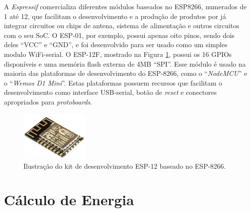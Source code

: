 A \textit{Espressif} comercializa diferentes módulos baseados no ESP8266, numerados de 1 até 12, que facilitam o desenvolvimento e a produção de produtos por já integrar circuitos ou chips de antena, sistema de alimentação e outros circuitos com o seu SoC. O ESP-01, por exemplo, possui apenas oito pinos, sendo dois deles ``VCC'' e ``GND'', e foi desenvolvido para ser usado como um simples modulo WiFi-serial. O ESP-12F, mostrado na Figura \ref{esp12}, possui os 16 GPIOs disponíveis e uma memória flash externa de 4MB ``SPI''. Esse módulo é usado na maioria das plataformas de desenvolvimento do ESP-8266, como o “\textit{NodeMCU}” e o “\textit{Wemos D1 Mini}”. Estas plataformas possuem recursos que facilitam o desenvolvimento como interface USB-serial, botão de \textit{reset} e conectores apropriados para \textit{protoboards}.

\begin{figure}[ht]
    \begin{center}
    \includegraphics[width=0.3\textwidth]{figuras/esp12.jpg}
    \end{center}
    \caption[Kit de desenvolvimento ESP-12.]{Ilustração do kit de desenvolvimento ESP-12 baseado no ESP-8266.}
    \label{esp12}
\end{figure}

\section{Cálculo de Energia}

